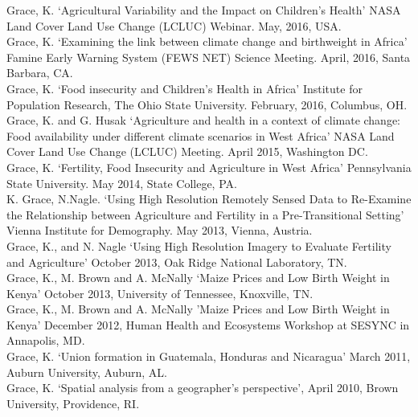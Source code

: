 \documentclass[11pt]{article} %
\begin{document}
\noindent
Grace, K. `Agricultural Variability and the Impact on Children's Health' NASA Land Cover Land Use Change (LCLUC) Webinar.  May, 2016, USA.\\

\noindent
Grace, K. `Examining the link between climate change and birthweight in Africa' Famine Early Warning System (FEWS NET) Science Meeting.  April, 2016, Santa Barbara, CA.\\

\noindent
Grace, K. `Food insecurity and Children's Health in Africa' Institute for Population Research, The Ohio State University. February, 2016, Columbus, OH.\\

\noindent
Grace, K. and G. Husak `Agriculture and health in a context of climate change: Food availability under different climate scenarios in West Africa' NASA Land Cover Land Use Change (LCLUC) Meeting. April 2015, Washington DC.\\

\noindent
Grace, K. `Fertility, Food Insecurity and Agriculture in West Africa' Pennsylvania State University. May 2014, State College, PA.\\

\noindent
K. Grace, N.Nagle. `Using High Resolution Remotely Sensed Data to Re-Examine the Relationship between Agriculture and Fertility in a Pre-Transitional Setting'  Vienna Institute for Demography. May 2013, Vienna, Austria.\\

\noindent
Grace, K., and N. Nagle `Using High Resolution Imagery to Evaluate Fertility and Agriculture' October 2013,  Oak Ridge National Laboratory, TN. \\

\noindent
Grace, K., M. Brown and A. McNally `Maize Prices and Low Birth Weight in Kenya' October 2013,  University of Tennessee, Knoxville, TN. \\

\noindent
Grace, K., M. Brown and A. McNally 'Maize Prices and Low Birth Weight in Kenya' December 2012,  Human Health and Ecosystems Workshop at SESYNC in Annapolis, MD.\\

\noindent
Grace, K. `Union formation in Guatemala, Honduras and Nicaragua' March 2011, Auburn University, Auburn, AL. \\

\noindent
Grace, K. `Spatial analysis from a geographer's perspective', April 2010, Brown University, Providence, RI. \\
\end{document}
